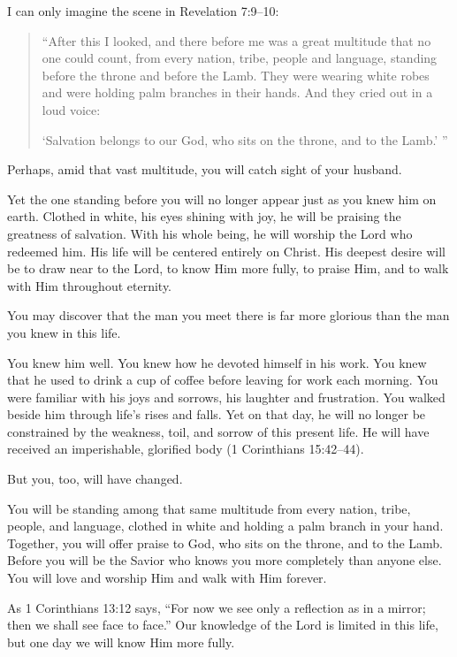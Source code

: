 I can only imagine the scene in Revelation 7:9--10:

\begin{quote}
``After this I looked, and there before me was a great multitude that no one could count, from every nation, tribe, people and language, standing before the throne and before the Lamb. They were wearing white robes and were holding palm branches in their hands. And they cried out in a loud voice:

`Salvation belongs to our God, who sits on the throne, and to the Lamb.' ''
\end{quote}

Perhaps, amid that vast multitude, you will catch sight of your husband.

Yet the one standing before you will no longer appear just as you knew him on earth. Clothed in white, his eyes shining with joy, he will be praising the greatness of salvation. With his whole being, he will worship the Lord who redeemed him. His life will be centered entirely on Christ. His deepest desire will be to draw near to the Lord, to know Him more fully, to praise Him, and to walk with Him throughout eternity.

You may discover that the man you meet there is far more glorious than the man you knew in this life.

You knew him well. You knew how he devoted himself in his work. You knew that he used to drink a cup of coffee before leaving for work each morning. You were familiar with his joys and sorrows, his laughter and frustration. You walked beside him through life's rises and falls. Yet on that day, he will no longer be constrained by the weakness, toil, and sorrow of this present life. He will have received an imperishable, glorified body (1 Corinthians 15:42--44).

But you, too, will have changed.

You will be standing among that same multitude from every nation, tribe, people, and language, clothed in white and holding a palm branch in your hand. Together, you will offer praise to God, who sits on the throne, and to the Lamb. Before you will be the Savior who knows you more completely than anyone else. You will love and worship Him and walk with Him forever.

As 1 Corinthians 13:12 says, ``For now we see only a reflection as in a mirror; then we shall see face to face.'' Our knowledge of the Lord is limited in this life, but one day we will know Him more fully. 


